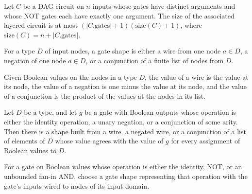 \begin{theorem}
\label{BoolCircuit.DAGCircuit.toLayered_size_le}
\leanok
{}
Let $C$ be a DAG circuit on $n$ inputs whose gates have distinct arguments and whose NOT
gates each have exactly one argument. The size of the associated layered circuit is at
most $(|C.\mathrm{gates}|+1)(\mathrm{size}(C)+1)$, where
$\mathrm{size}(C)=n+|C.\mathrm{gates}|$.
\end{theorem}

\begin{definition}
\label{BoolCircuit.GateShape}
\leanok
For a type $D$ of input nodes, a gate shape is either a wire from one node $a\in D$, a
negation of one node $a\in D$, or a conjunction of a finite list of nodes from $D$.
\end{definition}

\begin{definition}
\label{BoolCircuit.GateShape.eval}
\leanok
{}
Given Boolean values on the nodes in a type $D$, the value of a wire is the value at its
node, the value of a negation is one minus the value at its node, and the value of a
conjunction is the product of the values at the nodes in its list.
\end{definition}

\begin{theorem}
\label{BoolCircuit.exists_gateShape}
\leanok
{}
Let $D$ be a type, and let $g$ be a gate with Boolean outputs whose operation is either
the identity operation, a unary negation, or a conjunction of some arity. Then there is
a shape built from a wire, a negated wire, or a conjunction of a list of elements of $D$
whose value agrees with the value of $g$ for every assignment of Boolean values to $D$.
\end{theorem}

\begin{definition}
\label{BoolCircuit.gateShape}
\leanok
{}
For a gate on Boolean values whose operation is either the identity, NOT, or an
unbounded fan-in AND, choose a gate shape representing that operation with the gate's
inputs wired to nodes of its input domain.
\end{definition}

